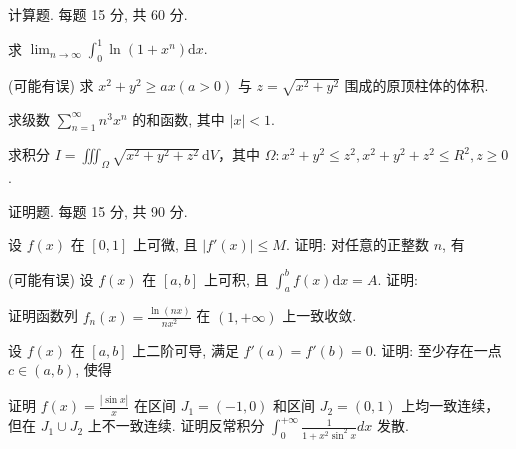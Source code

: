 \par{}
计算题. 每题 15 分, 共 60 分.\par
求 $\lim_{n\to \infty}\int_0^1\ln (1 + x^n)\mathrm{d}x.$\par
(可能有误) 求 $x^{2} + y^{2} \geq ax (a > 0)$ 与 $z = \sqrt{x^2 + y^2}$ 围成的原顶柱体的体积.\par
求级数 $\sum_{n=1}^{\infty} n^{3} x^{n}$ 的和函数, 其中 $|x| < 1$.\par
求积分 $I = \iiint_{\Omega} \sqrt{x^2 + y^2 + z^2} \, \mathrm{d}V$，其中 $\Omega: x^2 + y^2 \leq z^2, x^2 + y^2 + z^2 \leq R^2, z \geq 0$.\par
\par{}
证明题. 每题 15 分, 共 90 分.\par
\par{}
设 $f(x)$ 在 $[0,1]$ 上可微, 且 $|f'(x)| \leq M$. 证明: 对任意的正整数 $n$, 有\par
\nopagebreak[4]
\par{}
(可能有误) 设 $f(x)$ 在 $[a, b]$ 上可积, 且 $\int_{a}^{b} f(x) \mathrm{d}x = A$. 证明:\par
\nopagebreak[4]
证明函数列 $f_{n}(x) = \frac{\ln(nx)}{nx^{2}}$ 在 $(1, +\infty)$ 上一致收敛.\par
\par{}
设 $f(x)$ 在 $[a, b]$ 上二阶可导, 满足 $f'(a) = f'(b) = 0$. 证明: 至少存在一点 $c \in (a, b)$, 使得\par
\nopagebreak[4]
证明 $f(x) = \frac{|\sin x|}{x}$ 在区间 $J_{1} = (-1,0)$ 和区间 $J_{2} = (0,1)$ 上均一致连续，但在 $J_{1} \cup J_{2}$ 上不一致连续.
证明反常积分  $\int_{0}^{+\infty}\frac{1}{1+x^{2}\sin^{2}x}dx$  发散.\par
